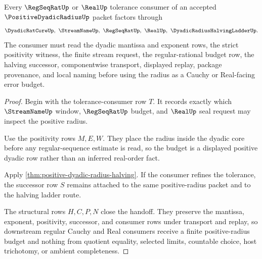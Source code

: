 \begin{theorem}
\label{thm:positive-dyadic-radius-regseq-budget}
Every $\RegSeqRatUp$ or $\RealUp$ tolerance consumer of an accepted $\PositiveDyadicRadiusUp$ packet factors through
$$
\DyadicRatCoreUp,\ \StreamNameUp,\ \RegSeqRatUp,\ \RealUp,\ \DyadicRadiusHalvingLadderUp .
$$
The consumer must read the dyadic mantissa and exponent rows, the strict positivity witness, the finite stream request, the regular-rational budget row, the halving successor, componentwise transport, displayed replay, package provenance, and local naming before using the radius as a Cauchy or Real-facing error budget.
\end{theorem}
\begin{proof}
Begin with the tolerance-consumer row $T$. It records exactly which $\StreamNameUp$ window, $\RegSeqRatUp$ budget, and $\RealUp$ seal request may inspect the positive radius.

Use the positivity rows $M,E,W$. They place the radius inside the dyadic core before any regular-sequence estimate is read, so the budget is a displayed positive dyadic row rather than an inferred real-order fact.

Apply \autoref{thm:positive-dyadic-radius-halving}. If the consumer refines the tolerance, the successor row $S$ remains attached to the same positive-radius packet and to the halving ladder route.

The structural rows $H,C,P,N$ close the handoff. They preserve the mantissa, exponent, positivity, successor, and consumer rows under transport and replay, so downstream regular Cauchy and Real consumers receive a finite positive-radius budget and nothing from quotient equality, selected limits, countable choice, host trichotomy, or ambient completeness.
\end{proof}



